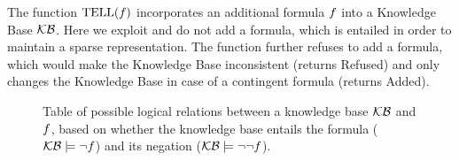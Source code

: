 The function $\mathrm{TELL}(f)$ incorporates an additional formula $f$ into a Knowledge Base $\mathcal{KB}$.
Here we exploit  and do not add a formula, which is entailed in order to maintain a sparse representation. %
The function further refuses to add a formula, which would make the Knowledge Base inconsistent (returns Refused) and only changes the Knowledge Base in case of a contingent formula (returns Added).


\begin{figure}
    \begin{center}
        
    \end{center}
    \caption{Table of possible logical relations between a knowledge base $\mathcal{KB}$ and $f$, based on whether the knowledge base entails the formula ($\mathcal{KB}\models\lnot f$) and its negation ($\mathcal{KB}\models\lnot\lnot f$).}\label{fig:askDecisionTable}
\end{figure}


